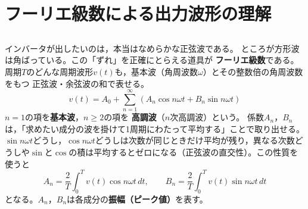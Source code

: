 
\section{フーリエ級数による出力波形の理解}
\label{sec9.3}

\subsection{}

インバータが出したいのは，本当はなめらかな正弦波である。
ところが方形波は角ばっている。この「ずれ」を正確にとらえる道具が
\textbf{フーリエ級数}である。
周期$T$のどんな周期波形$v(t)$も，基本波（角周波数$\omega$）とその整数倍の角周波数をもつ
正弦波・余弦波の和で表せる。
\begin{equation}
v(t) = A_0 + \sum_{n=1}^{\infty}\left(A_n \cos n\omega t + B_n \sin n\omega t\right)
\label{eq9.3}
\end{equation}
$n=1$の項を\textbf{基本波}，$n \ge 2$の項を
\textbf{高調波}（$n$次高調波）という。
係数$A_n$，$B_n$は，「求めたい成分の波を掛けて1周期にわたって平均する」ことで取り出せる。
$\sin n\omega t$どうし，$\cos n\omega t$どうしは次数が同じときだけ平均が残り，異なる次数どうしや$\sin$と$\cos$の積は平均するとゼロになる（正弦波の直交性）。この性質を使うと
\begin{equation}
A_n = \frac{2}{T}\int_0^T v(t)\cos n\omega t\,dt,
\qquad
B_n = \frac{2}{T}\int_0^T v(t)\sin n\omega t\,dt
\label{eq9.4}
\end{equation}
となる。$A_n$，$B_n$は各成分の\textbf{振幅（ピーク値）}を表す。

\subsection{}

